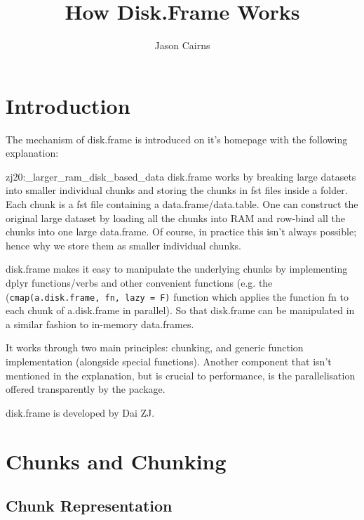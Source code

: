 \documentclass[10pt,a4paper]{article}
\begin{document}
\title{How Disk.Frame Works}
\author{Jason Cairns}
  
\maketitle{}

\section{Introduction}
\label{sec:introduction}

The mechanism of disk.frame is introduced on it's homepage with the
following explanation:

\begin{displaycquote}{zj20:_larger_ram_disk_based_data}
  {disk.frame} works by breaking large datasets into smaller
  individual chunks and storing the chunks in fst files inside a
  folder. Each chunk is a fst file containing a data.frame/data.table.
  One can construct the original large dataset by loading all the
  chunks into RAM and row-bind all the chunks into one large
  data.frame. Of course, in practice this isn’t always possible; hence
  why we store them as smaller individual chunks.

  {disk.frame} makes it easy to manipulate the underlying chunks by
  implementing dplyr functions/verbs and other convenient functions
  (e.g. the (\texttt{cmap(a.disk.frame, fn, lazy = F)} function which
  applies the function fn to each chunk of a.disk.frame in parallel).
  So that {disk.frame} can be manipulated in a similar fashion to
  in-memory data.frames.
\end{displaycquote}

It works through two main principles: chunking, and generic function
implementation (alongside special functions). Another component that
isn't mentioned in the explanation, but is crucial to performance, is
the parallelisation offered transparently by the package.

disk.frame is developed by Dai ZJ.

\section{Chunks and Chunking}
\label{sec:chunking}

\subsection{Chunk Representation}
\label{sec:chunk-representation}
\end{document}
